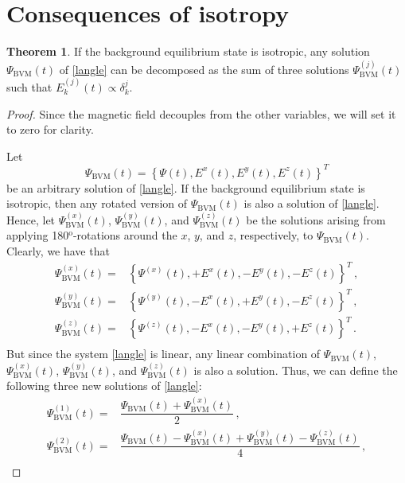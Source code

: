 \documentclass[a4paper, amsfonts, amssymb, amsmath, reprint, showkeys, nofootinbib, twoside,notitlepage,onecolumn]{revtex4-1}
\theoremstyle{definition}
\theoremstyle{theorem}
\newtheorem{theorem}{Theorem}
\begin{document}
\section{Consequences of isotropy}\label{appisotropy}

\begin{theorem}
If the background equilibrium state is isotropic, any solution $\Psi_{\text{BVM}}(t)$ of \eqref{langle} can be decomposed as the sum of three solutions $\Psi_{\text{BVM}}^{(j)}(t)$ such that $E_k^{(j)}(t)\propto \delta^j_k$.
\end{theorem}
\begin{proof}
Since the magnetic field decouples from the other variables, we will set it to zero for clarity.

Let
\begin{equation}
\Psi_{\text{BVM}}(t)= \left\{\Psi(t),E^x(t),E^y(t),E^z(t)\right\}^T 
\end{equation}
be an arbitrary solution of \eqref{langle}. If the background equilibrium state is isotropic, then any rotated version of $\Psi_{\text{BVM}}(t)$ is also a solution of \eqref{langle}. Hence, let $\Psi_{\text{BVM}}^{(x)}(t)$, $\Psi_{\text{BVM}}^{(y)}(t)$, and $\Psi_{\text{BVM}}^{(z)}(t)$ be the solutions arising from applying 180$^{\text{o}}$-rotations around the $x$, $y$, and $z$, respectively, to $\Psi_{\text{BVM}}(t)$. Clearly, we have that
\begin{equation}
\begin{split}
\Psi_{\text{BVM}}^{(x)}(t)={}& \left\{\Psi^{(x)}(t),+E^x(t),-E^y(t),-E^z(t)\right\}^T \, , \\
\Psi_{\text{BVM}}^{(y)}(t)={}& \left\{\Psi^{(y)}(t),-E^x(t),+E^y(t),-E^z(t)\right\}^T \, , \\
\Psi_{\text{BVM}}^{(z)}(t)={}& \left\{\Psi^{(z)}(t),-E^x(t),-E^y(t),+E^z(t)\right\}^T \, . \\
\end{split}
\end{equation}
But since the system \eqref{langle} is linear, any linear combination of $\Psi_{\text{BVM}}(t)$, $\Psi_{\text{BVM}}^{(x)}(t)$, $\Psi_{\text{BVM}}^{(y)}(t)$, and $\Psi_{\text{BVM}}^{(z)}(t)$ is also a solution. Thus, we can define the following three new solutions of \eqref{langle}:
\begin{equation}
\begin{split}
\Psi_{\text{BVM}}^{(1)}(t)={}& \dfrac{\Psi_{\text{BVM}}(t)+ \Psi_{\text{BVM}}^{(x)}(t)}{2} \, , \\
\Psi_{\text{BVM}}^{(2)}(t)={}& \dfrac{\Psi_{\text{BVM}}(t)- \Psi_{\text{BVM}}^{(x)}(t)+\Psi_{\text{BVM}}^{(y)}(t)- \Psi_{\text{BVM}}^{(z)}(t)}{4} \, , \\

\end{split}
\end{equation}
\end{proof}
\end{document}
